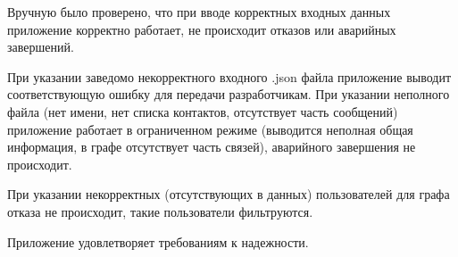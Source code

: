 Вручную было проверено, что при вводе корректных входных данных приложение корректно работает, не происходит отказов или аварийных завершений.

При указании заведомо некорректного входного .json файла приложение выводит соответствующую ошибку для передачи разработчикам.
При указании неполного файла (нет имени, нет списка контактов, отсутствует часть сообщений) приложение работает в ограниченном режиме (выводится неполная общая информация, в графе отсутствует часть связей), аварийного завершения не происходит.

При указании некорректных (отсутствующих в данных) пользователей для графа отказа не происходит, такие пользователи фильтруются.

Приложение удовлетворяет требованиям к надежности.